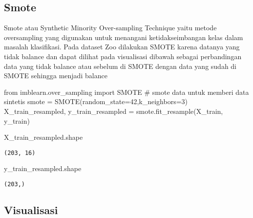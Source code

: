 \documentclass[
  letterpaper,
]{krantz}
\makeatletter
\newenvironment{Shaded}{\begin{snugshade}}{\end{snugshade}}
\newcommand{\CommentTok}[1]{\textcolor[rgb]{0.37,0.37,0.37}{#1}}
\newcommand{\DecValTok}[1]{\textcolor[rgb]{0.68,0.00,0.00}{#1}}
\newcommand{\ImportTok}[1]{\textcolor[rgb]{0.00,0.46,0.62}{#1}}
\newcommand{\NormalTok}[1]{\textcolor[rgb]{0.00,0.23,0.31}{#1}}
\newcommand{\OperatorTok}[1]{\textcolor[rgb]{0.37,0.37,0.37}{#1}}
\newenvironment{kframe}{%
\medskip{}
\setlength{\fboxsep}{.8em}
 \def\at@end@of@kframe{}%
 \ifinner\ifhmode%
  \def\at@end@of@kframe{\end{minipage}}%
  \begin{minipage}{\columnwidth}%
 \fi\fi%
 \def\FrameCommand##1{\hskip\@totalleftmargin \hskip-\fboxsep
 \colorbox{shadecolor}{##1}\hskip-\fboxsep
     \hskip-\linewidth \hskip-\@totalleftmargin \hskip\columnwidth}%
 \MakeFramed {\advance\hsize-\width
   \@totalleftmargin\z@ \linewidth\hsize
   \@setminipage}}%
 {\par\unskip\endMakeFramed%
 \at@end@of@kframe}
\renewenvironment{Shaded}{\begin{kframe}}{\end{kframe}}
\makeatother
\begin{document}
\hypertarget{smote}{%
\subsection{Smote}\label{smote}}

Smote atau Synthetic Minority Over-sampling Technique yaitu metode
oversampling yang digunakan untuk menangani ketidakseimbangan kelas
dalam masalah klasifikasi. Pada dataset Zoo dilakukan SMOTE karena
datanya yang tidak balance dan dapat dilihat pada visualisasi dibawah
sebagai perbandingan data yang tidak balance atau sebelum di SMOTE
dengan data yang sudah di SMOTE sehingga menjadi balance

\begin{Shaded}
\begin{Highlighting}[]
\ImportTok{from}\NormalTok{ imblearn.over\_sampling }\ImportTok{import}\NormalTok{ SMOTE}
\CommentTok{\# smote data untuk memberi data sintetis}
\NormalTok{smote }\OperatorTok{=}\NormalTok{ SMOTE(random\_state}\OperatorTok{=}\DecValTok{42}\NormalTok{,k\_neighbors}\OperatorTok{=}\DecValTok{3}\NormalTok{)}
\NormalTok{X\_train\_resampled, y\_train\_resampled }\OperatorTok{=}\NormalTok{ smote.fit\_resample(X\_train, y\_train)}
\end{Highlighting}
\end{Shaded}

\begin{Shaded}
\begin{Highlighting}[]
\NormalTok{X\_train\_resampled.shape}
\end{Highlighting}
\end{Shaded}

\begin{verbatim}
(203, 16)
\end{verbatim}

\begin{Shaded}
\begin{Highlighting}[]
\NormalTok{y\_train\_resampled.shape}
\end{Highlighting}
\end{Shaded}

\begin{verbatim}
(203,)
\end{verbatim}

\hypertarget{visualisasi}{%
\subsection{Visualisasi}\label{visualisasi}}
\end{document}
